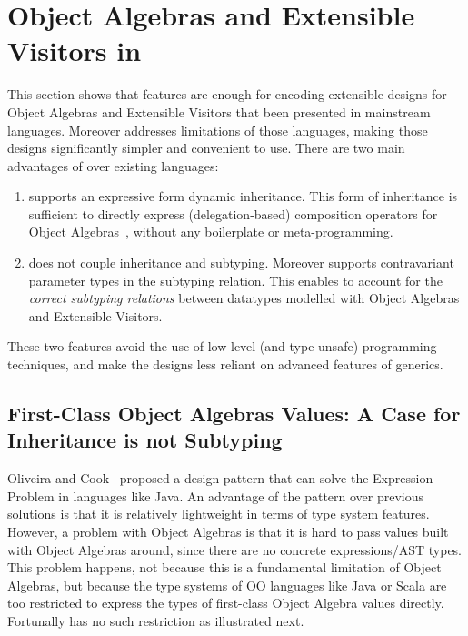 \section{Object Algebras and Extensible Visitors in \name}
\label{sec:OA}

This section shows that \name features are enough for encoding
extensible designs for Object Algebras and Extensible Visitors
that
been presented in mainstream languages. Moreover \name addresses
limitations of those languages, making those designs
significantly simpler and convenient to use. There are two main advantages of \name
over existing languages:
\begin{enumerate}
\item \name supports an expressive form dynamic inheritance. This form
  of inheritance is sufficient to directly express (delegation-based) composition
  operators for Object Algebras~\cite{}, without any boilerplate or meta-programming.
\item \name does not couple inheritance and subtyping. Moreover
\name supports contravariant parameter types in the subtyping
relation. This enables \name to account for the \emph{correct
subtyping relations} between datatypes modelled with Object Algebras 
and Extensible Visitors.
\end{enumerate}

These two features avoid the use of low-level (and type-unsafe) programming
techniques, and make the designs less reliant on advanced
features of generics.


\subsection{First-Class Object Algebras Values: A Case for Inheritance
is not Subtyping}
\label{sec:objectalgebra}

Oliveira and Cook~\cite{} proposed a design pattern that can
solve the Expression Problem in languages like Java. An
advantage of the pattern over previous solutions is that it is
relatively lightweight in terms of type system features. However, 
a problem with Object Algebras is that it is hard to pass 
values built with Object Algebras around, since there are 
no concrete expressions/AST types. This problem happens, not 
because this is a fundamental limitation of Object Algebras, but 
because the type systems of OO languages like Java or Scala 
are too restricted to express the types of first-class Object Algebra
values directly. Fortunally \name has no such restriction as
illustrated next. 


